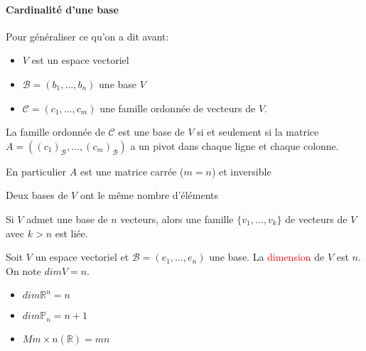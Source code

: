 \paragraph{Cardinalité d'une base}
Pour généraliser ce qu'on a dit avant:
\begin{itemize}
    \item $V$ est un espace vectoriel
    \item $\mathcal{B} = (b_1, \dots, b_n)$ une base $V$
    \item $\mathcal{C} = (c_1, \dots, c_m)$ une famille ordonnée de vecteurs de $V$.
\end{itemize}

\begin{theoreme}
    La famille ordonnée de $\mathcal{C}$ est une base de $V$ si et seulement si la matrice $A = ((c_1)_{\mathcal{B}}, \dots, (c_m)_{\mathcal{B}})$ a un pivot dans chaque ligne et chaque colonne.
\end{theoreme}
\begin{framedremark}
    En particulier $A$ est une matrice carrée ($m = n$) et inversible
\end{framedremark}
\begin{theoreme}
    Deux bases de $V$ ont le même nombre d'éléments
\end{theoreme}
\begin{corollaire}
Si $V$ admet une base de $n$ vecteurs, alors une famille $\{v_1, \dots, v_k\}$ de vecteurs de $V$ avec $k > n$ est liée.
\end{corollaire}
\begin{definition}
    Soit $V$ un espace vectoriel et $\mathcal{B} = (e_1, \dots, e_n)$ une base. La \textcolor{red}{dimension} de $V$ est $n$. On note $dim V = n$.
\end{definition}

\begin{itemize}
    \item $dim \mathbb{R}^n = n$
    \item $dim \mathbb{P}_n = n+1$
    \item $M{m\times n}(\mathbb{R}) = mn$
\end{itemize}